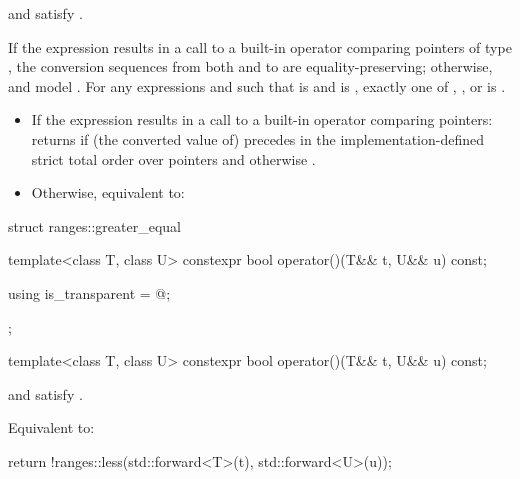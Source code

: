 \begin{itemdescr}
\pnum
\constraints
{} and  satisfy .

\pnum
\expects
If the expression  results in a
call to a built-in operator \tcode{<} comparing pointers of type , the
conversion sequences from both  and  to  are
equality-preserving;
otherwise,  and  model .
For any expressions
 and  such that  is  and
 is , exactly one of
,
, or
is .

\pnum
\effects
\begin{itemize}
\item
If the expression  results in a
call to a built-in operator \tcode{<} comparing pointers:
returns  if (the converted value of)  precedes  in
the implementation-defined strict total order over pointers
and otherwise .

\item
Otherwise, equivalent to:
\end{itemize}
\end{itemdescr}

%
\begin{codeblock}
struct ranges::greater_equal {
  template<class T, class U>
    constexpr bool operator()(T&& t, U&& u) const;

  using is_transparent = @\unspecnc@;
};
\end{codeblock}

\begin{itemdecl}
template<class T, class U>
  constexpr bool operator()(T&& t, U&& u) const;
\end{itemdecl}

\begin{itemdescr}
\pnum
\constraints
{} and  satisfy .

\pnum
\effects
Equivalent to:
\begin{codeblock}
return !ranges::less{}(std::forward<T>(t), std::forward<U>(u));
\end{codeblock}
\end{itemdescr}

